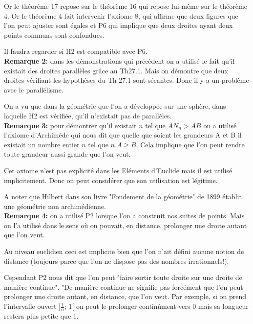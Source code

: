 \documentclass[a4paper, 12pt, twoside]{book}
\begin{document}
 
 
 Or le théorème 17 repose sur le théorème 16 qui repose lui-même sur le théorème 4. Or le théorème 4 fait intervenir l'axiome 8, qui affirme que deux figures que l'on peut ajuster sont égales et  P6 qui implique que deux droites ayant deux points communs sont confondues.\
 
 Il faudra regarder si H2 est compatible avec P6.\\
 
 \textbf{Remarque 2:} dans les démonstrations qui précèdent on a utilisé le fait qu'il existait des droites parallèles grâce au Th27.1. Mais on démontre que deux droites vérifiant les hypothèses du Th 27.1 sont sécantes.  Donc il y a un problème avec le parallélisme.\
 
On a vu que dans la géométrie que l'on a développée sur une  sphère, dans laquelle H2 est vérifiée, qu'il n'existait pas de parallèles.\\  
 
 
  \textbf{Remarque 3:} pour démontrer qu'il existait $n$ tel que $AN_{n}>AB$  on a  utilisé l'axiome d'Archimède qui nous dit que quelle que soient les grandeurs A et B il existait un nombre entier $n$ tel que $n.A\geq B$. Cela implique que l'on peut rendre toute grandeur aussi grande que l'on veut.\
  
  Cet axiome n'est pas explicité dans les Eléments d'Euclide mais il est utilisé implicitement. Donc on peut considérer que son utilisation est légitime.\
  
  A noter que Hilbert dans son livre "Fondement de la géométrie" de 1899 établit une géométrie non archimédienne.\\
  
   \textbf{Remarque 4:} on a utilisé P2 lorsque l'on a construit nos suites de points. Mais on l'a utilisé dans le sens où on pouvait, en distance, prolonger une droite autant que l'on veut.\
   
   Au niveau euclidien ceci est implicite bien que l'on n'ait défini aucune notion de distance (toujours parce que l'on ne dispose pas des nombres irrationnels!).\
   
   Cependant P2 nous dit que l'on peut "faire sortir toute droite sur une droite de manière continue". "De manière continue ne signifie pas forcément que l'on peut prolonger une droite autant, en distance, que l'on veut. Par exemple, si on prend l'intervalle ouvert ]$\frac{1}{n}$; 1[ on peut le prolonger continûment vers 0 mais sa longueur restera plus petite que 1. \\
  
\end{document}
